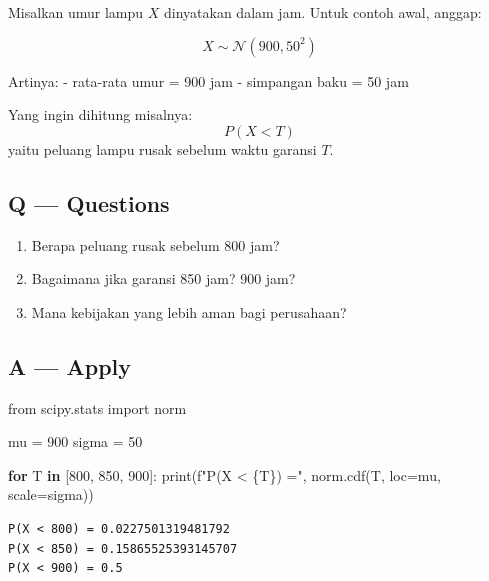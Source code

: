 \documentclass[
  letterpaper,
  DIV=11,
  numbers=noendperiod]{scrreprt}
\newenvironment{Shaded}{\begin{snugshade}}{\end{snugshade}}
\newcommand{\BuiltInTok}[1]{\textcolor[rgb]{0.00,0.23,0.31}{#1}}
\newcommand{\ControlFlowTok}[1]{\textcolor[rgb]{0.00,0.23,0.31}{\textbf{#1}}}
\newcommand{\DecValTok}[1]{\textcolor[rgb]{0.68,0.00,0.00}{#1}}
\newcommand{\ImportTok}[1]{\textcolor[rgb]{0.00,0.46,0.62}{#1}}
\newcommand{\KeywordTok}[1]{\textcolor[rgb]{0.00,0.23,0.31}{\textbf{#1}}}
\newcommand{\NormalTok}[1]{\textcolor[rgb]{0.00,0.23,0.31}{#1}}
\newcommand{\OperatorTok}[1]{\textcolor[rgb]{0.37,0.37,0.37}{#1}}
\newcommand{\SpecialCharTok}[1]{\textcolor[rgb]{0.37,0.37,0.37}{#1}}
\newcommand{\SpecialStringTok}[1]{\textcolor[rgb]{0.13,0.47,0.30}{#1}}
\providecommand{\tightlist}{%
  \setlength{\itemsep}{0pt}\setlength{\parskip}{0pt}}
\begin{document}
Misalkan umur lampu \(X\) dinyatakan dalam jam. Untuk contoh awal,
anggap:

\[
X \sim \mathcal{N}(900, 50^2)
\]

Artinya: - rata-rata umur = 900 jam - simpangan baku = 50 jam

Yang ingin dihitung misalnya: \[
P(X < T)
\] yaitu peluang lampu rusak sebelum waktu garansi \(T\).

\subsection{Q --- Questions}\label{q-questions-3}

\begin{enumerate}
\def\labelenumi{\arabic{enumi}.}
\tightlist
\item
  Berapa peluang rusak sebelum 800 jam?
\item
  Bagaimana jika garansi 850 jam? 900 jam?
\item
  Mana kebijakan yang lebih aman bagi perusahaan?
\end{enumerate}

\subsection{A --- Apply}\label{a-apply-3}

\begin{Shaded}
\begin{Highlighting}[]
\ImportTok{from}\NormalTok{ scipy.stats }\ImportTok{import}\NormalTok{ norm}

\NormalTok{mu }\OperatorTok{=} \DecValTok{900}
\NormalTok{sigma }\OperatorTok{=} \DecValTok{50}

\ControlFlowTok{for}\NormalTok{ T }\KeywordTok{in}\NormalTok{ [}\DecValTok{800}\NormalTok{, }\DecValTok{850}\NormalTok{, }\DecValTok{900}\NormalTok{]:}
    \BuiltInTok{print}\NormalTok{(}\SpecialStringTok{f"P(X \textless{} }\SpecialCharTok{\{}\NormalTok{T}\SpecialCharTok{\}}\SpecialStringTok{) ="}\NormalTok{, norm.cdf(T, loc}\OperatorTok{=}\NormalTok{mu, scale}\OperatorTok{=}\NormalTok{sigma))}
\end{Highlighting}
\end{Shaded}

\begin{verbatim}
P(X < 800) = 0.0227501319481792
P(X < 850) = 0.15865525393145707
P(X < 900) = 0.5
\end{verbatim}
\end{document}
